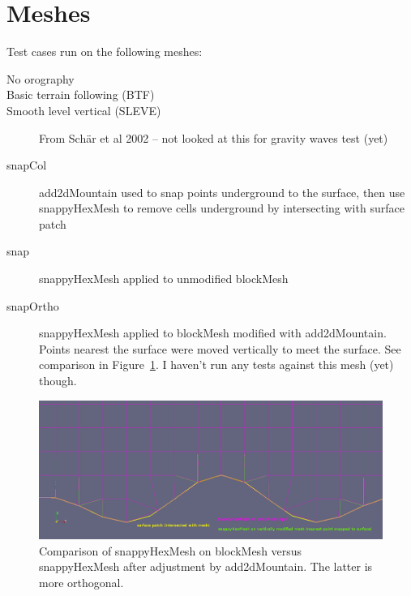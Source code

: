 \section{Meshes}

Test cases run on the following meshes:
\begin{description}
\item[No orography]
\item[Basic terrain following (BTF)]
\item[Smooth level vertical (SLEVE)]{From Sch{\"a}r et al 2002 -- not looked at this for gravity waves test (yet)}
\item[snapCol]{add2dMountain used to snap points underground to the surface, then use snappyHexMesh to remove cells underground by intersecting with surface patch}
\item[snap]{snappyHexMesh applied to unmodified blockMesh}
\item[snapOrtho]{snappyHexMesh applied to blockMesh modified with add2dMountain.  Points nearest the surface were moved vertically to meet the surface.  See comparison in Figure~\ref{fig:snap-mesh-compare}.  I haven't run any tests against this mesh (yet) though.}
\end{description}

\begin{figure}
\includegraphics[width=\textwidth]{interim-results/cutCellWarpToSurfaceSchaerExp.png}
\caption{Comparison of snappyHexMesh on blockMesh versus snappyHexMesh after adjustment by add2dMountain.  The latter is more orthogonal.}
\label{fig:snap-mesh-compare}
\end{figure}
